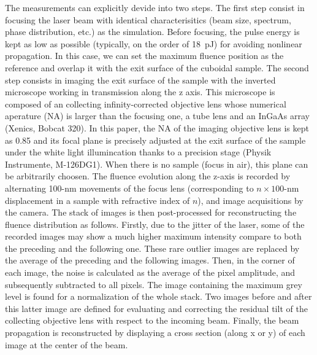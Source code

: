 \documentclass[9pt,twocolumn,twoside]{osajnl}
\begin{document}
The measurements can explicitly devide into two steps. The first step consist in focusing the laser beam with identical characterisitics (beam size, spectrum, phase distribution, etc.) as the simulation. Before focusing, the pulse energy is kept as low as possible (typically, on the order of 18~pJ) for avoiding nonlinear propagation. In this case, we can set the maximum fluence position as the reference and overlap it with the exit surface of the cuboidal sample. The second step consists in imaging the exit surface of the sample with the inverted microscope working in transmission along the z axis. This microscope is composed of an collecting infinity-corrected objective lens whose numerical aperature (NA) is larger than the focusing one, a tube lens and an InGaAs array (Xenics, Bobcat 320). In this paper, the NA of the imaging objective lens is kept as 0.85 and its focal plane is precisely adjusted at the exit surface of the sample under the white light illumincation thanks to a precision stage (Physik Instrumente, M-126DG1). When there is no sample (focus in air), this plane can be arbitrarily choosen. The fluence evolution along the z-axis is recorded by alternating 100-nm movements of the focus lens (corresponding to $n\times100$-nm displacement in a sample with refractive index of $n$), and image acquisitions by the camera. The stack of images is then post-processed for reconstructing the fluence distribution as follows. Firstly, due to the jitter of the laser, some of the recorded images may show a much higher maximum intensity compare to both the preceding and the following one. These rare outlier images are replaced by the average of the preceding and the following images. Then, in the corner of each image, the noise is calculated as the average of the pixel amplitude, and subsequently subtracted to all pixels. The image containing the maximum grey level is found for a normalization of the whole stack. Two images before and after this latter image are defined for evaluating and correcting the residual tilt of the collecting objective lens with respect to the incoming beam. Finally, the beam propagation is reconstructed by displaying a cross section (along x or y) of each image at the center of the beam. 
\end{document}
